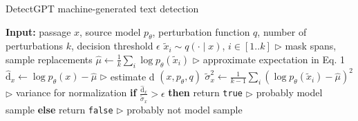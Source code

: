 \documentclass[11pt]{article}
\begin{document}
\begin{algorithm*}[h]
  \caption{DetectGPT machine-generated text detection}
  \begin{algorithmic}[1]
    \label{alg:detectgpt}
\State \textbf{Input:} passage $x$, source model $p_\theta$, perturbation function $q$, number of perturbations $k$, decision threshold $\epsilon$
\State $\tilde{x}_i \sim q(\cdot \mid x)$, $i \in [1..k]$ \hfill $\triangleright$ mask spans, sample replacements
\State $\hat{\mu} \leftarrow \frac{1}{k} \sum_i \log p_\theta(\tilde{x}_i)$ \hfill $\triangleright$ approximate expectation in Eq. 1
\State $\hat{\mathrm{d}}_x \leftarrow \log p_\theta(x) - \hat{\mu}$ \hfill $\triangleright$ estimate d $(x, p_\theta, q)$
\State $\tilde{\sigma}_x^2 \leftarrow \frac{1}{k-1} \sum_i (\log p_\theta(\tilde{x}_i) - \hat{\mu})^2$ \hfill $\triangleright$ variance for normalization
\State \textbf{if} $\frac{\hat{\mathrm{d}}_x}{\tilde{\sigma}_x} > \epsilon$ \textbf{then}
\State \quad return \texttt{true} \hfill $\triangleright$ probably model sample
\State \textbf{else}
\State \quad return \texttt{false} \hfill $\triangleright$ probably not model sample
\end{algorithmic}
\end{algorithm*}



\newpage

%

\end{document}
